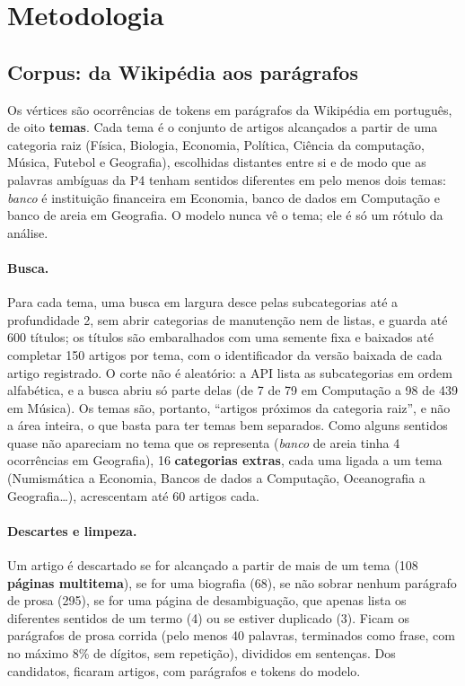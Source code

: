 \section{Metodologia}\label{sec:metodologia}

\subsection{Corpus: da Wikipédia aos parágrafos}\label{sec:dados}

Os vértices são ocorrências de tokens em parágrafos da Wikipédia em português, de oito
\textbf{temas}. Cada tema é o conjunto de artigos alcançados a partir de uma categoria raiz
(Física, Biologia, Economia, Política, Ciência da computação, Música, Futebol e Geografia),
escolhidas distantes entre si e de modo que as palavras ambíguas da P4 tenham sentidos
diferentes em pelo menos dois temas: \emph{banco} é instituição financeira em Economia, banco
de dados em Computação e banco de areia em Geografia. O modelo nunca vê o tema; ele é só um
rótulo da análise.

\paragraph{Busca.} Para cada tema, uma busca em largura desce pelas subcategorias até a
profundidade 2, sem abrir categorias de manutenção nem de listas, e guarda até 600 títulos; os
títulos são embaralhados com uma semente fixa e baixados até completar 150 artigos por tema,
com o identificador da versão baixada de cada artigo registrado. O corte não é aleatório: a API lista as subcategorias em
ordem alfabética, e a busca abriu só parte delas (de 7 de 79 em Computação a 98 de 439 em
Música). Os temas são, portanto, ``artigos próximos da categoria raiz'', e não a área
inteira, o que basta para ter temas bem separados. Como alguns sentidos quase não apareciam no
tema que os representa (\emph{banco} de areia tinha 4 ocorrências em Geografia), 16
\textbf{categorias extras}, cada uma ligada a um tema (Numismática a Economia, Bancos de dados
a Computação, Oceanografia a Geografia\ldots), acrescentam até 60 artigos cada.

\paragraph{Descartes e limpeza.} Um artigo é descartado se for alcançado a partir de mais de
um tema (108 \textbf{páginas multitema}), se for uma biografia (68), se não sobrar nenhum parágrafo de prosa (295), se for uma 
página de desambiguação, que apenas lista os diferentes sentidos de um termo (4) 
ou se estiver duplicado (3). Ficam os parágrafos de prosa corrida (pelo menos 40 palavras, terminados como frase, com
no máximo 8\% de dígitos, sem repetição), divididos em sentenças. Dos \nArtigosCandidatos{}
candidatos, ficaram \nArtigos{} artigos, com \nParagrafos{} parágrafos e \nTokensCorpus{}
tokens do modelo.

